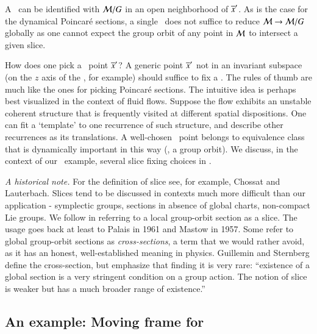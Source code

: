\documentclass[preprint,number,sort&compress]{elsarticle}
\begin{document}
A \slice\ can be identified with ${\cal M}/G$ in an open
neighborhood of ${\overline{x}'}$. As is the case for the dynamical
Poincar\'e sections, a single \slice\ does not
suffice to reduce ${\cal M} \to {\cal M}/G$ globally as
 one cannot expect the group orbit
of any point in ${\cal M}$ to intersect a given slice.

How does one pick a \slice\ point ${\overline{x}'}$? A generic point
${\overline{x}'} $ not in an in\-vari\-ant subspace (on the $z$
axis of the \cLe, for example) should suffice to fix a \slice.
The rules of thumb are much like the ones for picking
Poincar\'e sections. The intuitive
idea is perhaps best visualized in the context of fluid
flows. Suppose the flow exhibits an unstable coherent
structure that {is frequently visited at}
different spatial dispositions. One can fit a `template' to one
recurrence of such structure, and describe other recurrences
as its translations. A well-chosen \slice\ point belongs to
{equivalence class that is dynamically important in
this way} (\ie, a group orbit).
We discuss, in the context of our \cLe\ example, several slice fixing
choices in .

\emph{A historical note.}
For the definition of slice see, for example,  Chossat and
Lauterbach. Slices tend to be discussed in
contexts much more difficult than our application -
symplectic groups, sections in absence of global charts,
non-compact Lie groups. We follow
 in referring to a local
group-orbit section as a slice. The usage goes back at least
to Palais in 1961 and Mastow in 1957.
Some refer to global group-orbit
sections as \emph{cross-sections}, a term that we would rather
avoid, as it has an honest, well-established meaning in
physics.
Guillemin and Sternberg define the
cross-section, but emphasize that finding it is very
rare: ``existence of a global section is a very stringent
condition on a group action. The notion of slice is weaker
but has a much broader range of existence.''


\subsection{\label{sec:CLeMovFr}An example: Moving frame for \cLe}
\end{document}
